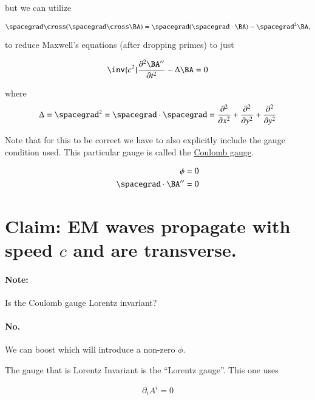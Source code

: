 but we can utilize

\begin{equation}\label{eqn:relativisticElectrodynamicsL14:310}
\spacegrad \cross (\spacegrad \cross \BA) = \spacegrad (\spacegrad \cdot \BA) - \spacegrad^2 \BA,
\end{equation}

to reduce Maxwell's equations (after dropping primes) to just

\begin{equation}\label{eqn:relativisticElectrodynamicsL14:330}
\inv{c^2} \frac{\partial^2 \BA''}{\partial t^2} - \Delta \BA = 0
\end{equation}

where 
\begin{equation}\label{eqn:relativisticElectrodynamicsL14:350}
\Delta = \spacegrad^2 = \spacegrad \cdot \spacegrad = 
\frac{\partial^2}{\partial x^2}
+\frac{\partial^2}{\partial y^2}
+\frac{\partial^2}{\partial y^2}
\end{equation}

Note that for this to be correct we have to also explicitly include the gauge condition used.  This particular gauge is called the \underline{Coulomb gauge}.

\begin{align}\label{eqn:relativisticElectrodynamicsL14:370}
\phi &= 0 \\
\spacegrad \cdot \BA'' &= 0 
\end{align}

\section{Claim: EM waves propagate with speed $c$ and are transverse.}

\paragraph{Note:} Is the Coulomb gauge Lorentz invariant?
\paragraph{No.} We can boost which will introduce a non-zero $\phi$.

The gauge that is Lorentz Invariant is the ``Lorentz gauge''.  This one uses

\begin{equation}\label{eqn:relativisticElectrodynamicsL14:390}
\partial_i A^i = 0
\end{equation}

